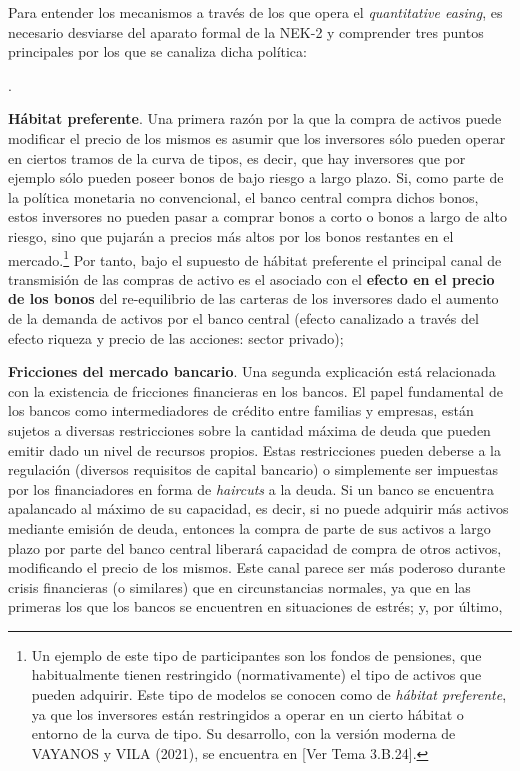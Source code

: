 \documentclass[10pt,a4paper]{article}
\newcounter{numitem}
\newenvironment{lnum}
      {\begin{list}{\arabic{numitem}.}{%
          \usecounter{numitem}%
          \setlength{\leftmargin}{1cm}%
          \setlength{\parskip}{3pt}%
          \setlength{\itemsep}{0pt}%
          \setlength{\parsep}{0pt}%
      }}
      {\end{list}}
\newcommand{\authorfont}[1]{{\fontfamily{EBGaramond-TLF}\selectfont #1}}
\begin{document}
Para entender los mecanismos a través de los que opera el \textit{quantitative easing}, es necesario desviarse del aparato formal de la NEK-2 y comprender tres puntos principales por los que se canaliza dicha política:
\begin{lnum}
    \item \textbf{Hábitat preferente}. Una primera razón por la que la compra de activos puede modificar el precio de los mismos es asumir que los inversores sólo pueden operar en ciertos tramos de la curva de tipos, es decir, que hay inversores que por ejemplo sólo pueden poseer bonos de bajo riesgo a largo plazo. Si, como parte de la política monetaria no convencional, el banco central compra dichos bonos, estos inversores no pueden pasar a comprar bonos a corto o bonos a largo de alto riesgo, sino que pujarán a precios más altos por los bonos restantes en el mercado.\footnote{%
        Un ejemplo de este tipo de participantes son los fondos de pensiones, que habitualmente tienen restringido (normativamente) el tipo de activos que pueden adquirir. Este tipo de modelos se conocen como de \textit{hábitat preferente}, ya que los inversores están restringidos a operar en un cierto hábitat o entorno de la curva de tipo. Su desarrollo, con la versión moderna de VAYANOS y VILA (2021), se encuentra en [\authorfont{Ver Tema 3.B.24}].
    } Por tanto, bajo el supuesto de hábitat preferente el principal canal de transmisión de las compras de activo es el asociado con el \textbf{efecto en el precio de los bonos} del re-equilibrio de las carteras de los inversores dado el aumento de la demanda de activos por el banco central (efecto canalizado a través del efecto riqueza y precio de las acciones: sector privado);
    \item \textbf{Fricciones del mercado bancario}. Una segunda explicación está relacionada con la existencia de fricciones financieras en los bancos. El papel fundamental de los bancos como intermediadores de crédito entre familias y empresas, están sujetos a diversas restricciones sobre la cantidad máxima de deuda que pueden emitir dado un nivel de recursos propios. Estas restricciones pueden deberse a la regulación (diversos requisitos de capital bancario) o simplemente ser impuestas por los financiadores en forma de \textit{haircuts} a la deuda. Si un banco se encuentra apalancado al máximo de su capacidad, es decir, si no puede adquirir más activos mediante emisión de deuda, entonces la compra de parte de sus activos a largo plazo por parte del banco central liberará capacidad de compra de otros activos, modificando el precio de los mismos. Este canal parece ser más poderoso durante crisis financieras (o similares) que en circunstancias normales, ya que en las primeras los que los bancos se encuentren en situaciones de estrés; y, por último, 

\end{lnum}
\end{document}
